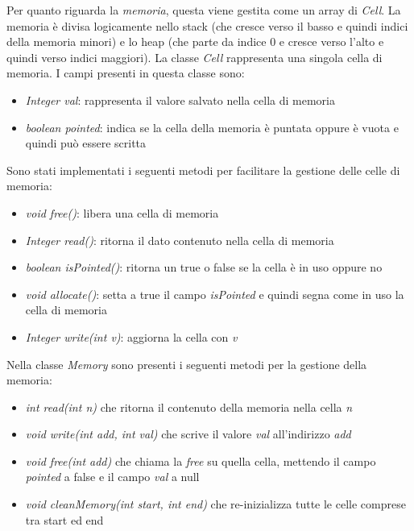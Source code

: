 \documentclass[../../main]{subfiles}
\begin{document}
Per quanto riguarda la \emph{memoria}, questa viene gestita come un array di \emph{Cell}. La memoria è divisa logicamente nello stack (che cresce verso il basso e quindi indici della memoria minori) e lo heap (che parte da indice 0 e cresce verso l'alto e quindi verso indici maggiori).
\newline
La classe \emph{Cell} rappresenta una singola cella di memoria. I campi presenti in questa classe sono:
\begin{itemize}
    \item \emph{Integer val}: rappresenta il valore salvato nella cella di memoria
    \item \emph{boolean pointed}: indica se la cella della memoria è puntata oppure è vuota e quindi può essere scritta
\end{itemize}
Sono stati implementati i seguenti metodi per facilitare la gestione delle celle di memoria: 
\begin{itemize}
    \item \emph{void free()}: libera una cella di memoria
    \item \emph{Integer read()}: ritorna il dato contenuto nella cella di memoria
    \item \emph{boolean isPointed()}: ritorna un true o false se la cella è in uso oppure no
    \item \emph{void allocate()}: setta a true il campo \emph{isPointed} e quindi segna come in uso la cella di memoria
    \item \emph{Integer write(int v)}: aggiorna la cella con \emph{v}
\end{itemize}
\newline
Nella classe \emph{Memory} sono presenti i seguenti metodi per la gestione della memoria: 
\begin{itemize}
    \item \emph{int read(int n)} che ritorna il contenuto della memoria nella cella \emph{n}
    \item \emph{void write(int add, int val)} che scrive il valore \emph{val} all'indirizzo \emph{add}
    \item \emph{void free(int add)} che chiama la \emph{free} su quella cella, mettendo il campo \emph{pointed} a false e il campo \emph{val} a null
    \item \emph{void cleanMemory(int start, int end)} che re-inizializza tutte le celle comprese tra start ed end
\end{itemize}
\end{document}
